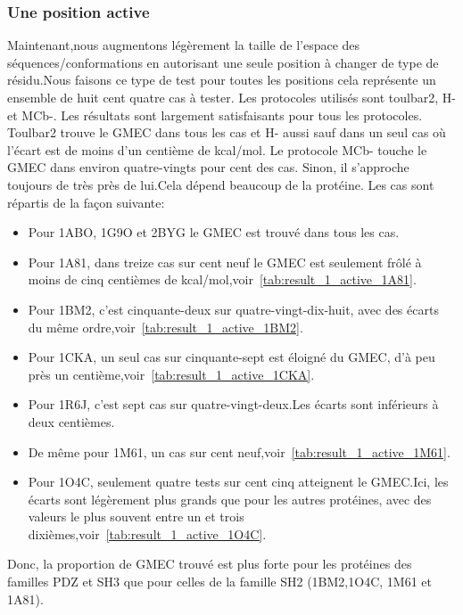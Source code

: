    \subsubsection{Une position active}

Maintenant,nous augmentons légèrement la taille de l'espace des séquences/conformations en autorisant une seule position à changer de type de résidu.Nous faisons ce type de test pour toutes les positions cela représente un ensemble de huit cent quatre cas à tester. Les protocoles utilisés sont toulbar2, H- et MCb-. Les résultats sont largement satisfaisants pour tous les protocoles. Toulbar2 trouve le GMEC dans tous les cas et H- aussi sauf dans un seul cas où l'écart est de moins d'un centième de kcal/mol. Le protocole MCb- touche le GMEC dans environ quatre-vingts pour cent des cas. Sinon, il s'approche toujours de très près de lui.Cela dépend beaucoup de la protéine. Les cas sont répartis de la façon suivante:  

\begin{itemize}
\item Pour 1ABO, 1G9O et 2BYG le GMEC est trouvé dans tous les cas.
\item Pour 1A81, dans treize cas sur cent neuf le GMEC est seulement frôlé à moins de cinq centièmes de kcal/mol,voir~\ref{tab:result_1_active_1A81}.
\item Pour 1BM2,  c'est cinquante-deux sur quatre-vingt-dix-huit, avec des écarts du même ordre,voir~\ref{tab:result_1_active_1BM2}.
\item Pour 1CKA, un seul cas sur cinquante-sept est éloigné du GMEC, d'à peu près un centième,voir~\ref{tab:result_1_active_1CKA}.
\item Pour 1R6J, c'est sept cas sur quatre-vingt-deux.Les écarts sont inférieurs à deux centièmes.
\item De même pour 1M61, un cas sur cent neuf,voir~\ref{tab:result_1_active_1M61}.
\item Pour 1O4C, seulement quatre tests sur cent cinq atteignent le GMEC.Ici, les écarts sont légèrement plus grands que pour les autres protéines, avec des valeurs le plus souvent entre un et trois dixièmes,voir~\ref{tab:result_1_active_1O4C}. 
\end{itemize}

Donc, la proportion de GMEC trouvé est plus forte  pour les protéines des familles PDZ et SH3 que pour celles de la famille SH2 (1BM2,1O4C, 1M61 et 1A81).

